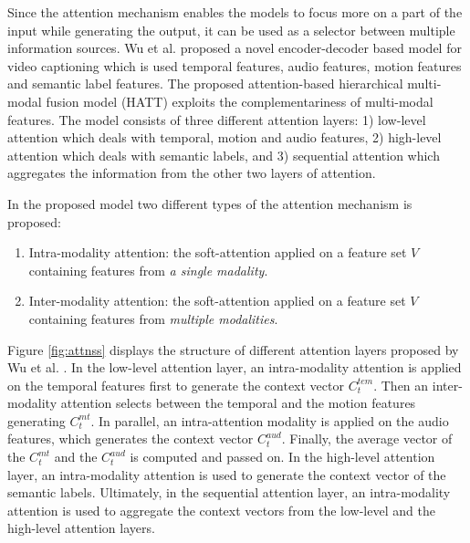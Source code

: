 \documentclass[preprint, 12pt]{elsarticle}
\begin{document}
		Since the attention mechanism enables the models to focus more on a part of the input while generating the output, it can be used as a selector between multiple information sources. Wu et al. \cite{wu2018hierarchical} proposed a novel encoder-decoder based model for video captioning which is used temporal features, audio features, motion features and semantic label features. The proposed attention-based hierarchical multi-modal fusion model (HATT) exploits the complementariness of multi-modal features. The model consists of three different attention layers: 1) low-level attention which deals with temporal, motion and audio features, 2) high-level attention which deals with semantic labels, and 3) sequential attention which aggregates the information from the other two layers of attention. 
		
		In the proposed model two different types of the attention mechanism is proposed:
		\begin{enumerate}
			\item Intra-modality attention: the soft-attention applied on a feature set $V$ containing features from \textit{a single madality}.
			
			\item Inter-modality attention: the soft-attention applied on a feature set $V$ containing features from \textit{multiple modalities}.
		\end{enumerate}
Figure \ref{fig:attnss} displays the structure of different attention layers proposed by Wu et al. \cite{wu2018hierarchical}. In the low-level attention layer, an intra-modality attention is applied on the temporal features first to generate the context vector $C_t^{tem}$. Then an inter-modality attention selects between the temporal and the motion features generating $C_t^{mt}$. In parallel, an intra-attention modality is applied on the audio features, which generates the context vector $C_t^{aud}$. Finally, the average vector of the $C_t^{mt}$ and the $C_t^{aud}$ is computed and passed on. In the high-level attention layer, an intra-modality attention is used to generate the context vector of the semantic labels. Ultimately, in the sequential attention layer, an intra-modality attention is used to aggregate the context vectors from the low-level and the high-level attention layers.
\end{document}

